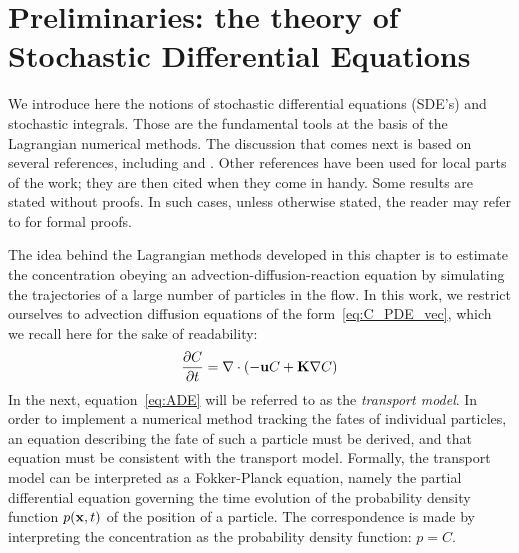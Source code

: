 \section{Preliminaries: the theory of Stochastic Differential Equations}
We introduce here the notions of stochastic differential equations (SDE's) and stochastic integrals. Those are the fundamental tools at the basis of the Lagrangian numerical methods. The discussion that comes next is based on several references, including \cite{spivakovskaya2007lagrangian} and \cite{gardiner1985stochastic,heemink2011slides,keunings,shah2017tracing}. Other references have been used for local parts of the work; they are then cited when they come in handy. Some results are stated without proofs. In such cases, unless otherwise stated, the reader may refer to \cite{gardiner1985stochastic} for formal proofs.

The idea behind the Lagrangian methods developed in this chapter is to estimate the concentration obeying an advection-diffusion-reaction equation by simulating the trajectories of a large number of particles in the flow. In this work, we restrict ourselves to advection diffusion equations of the form~\eqref{eq:C_PDE_vec}, which we recall here for the sake of readability:
\begin{equation} \label{eq:ADE}
	\frac{\partial C}{\partial t} = \nabla \cdot (-\mathbf u C + \mathbf K \nabla C)
\end{equation}
In the next, equation~\eqref{eq:ADE} will be referred to as the \textit{transport model}. In order to implement a numerical method tracking the fates of individual particles, an equation describing the fate of such a particle must be derived, and that equation must be consistent with the transport model. Formally, the transport model can be interpreted as a Fokker-Planck equation, namely the partial differential equation governing the time evolution of the probability density function $p(\mathbf x,t)$ of the position of a particle. The correspondence is made by interpreting the concentration as the probability density function: $p=C$. 

